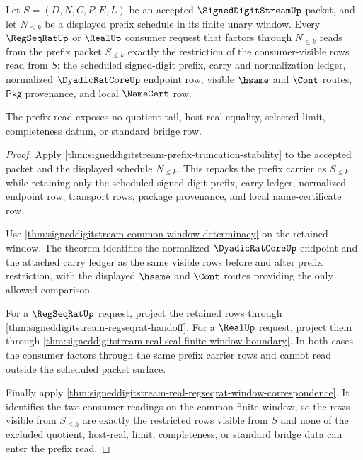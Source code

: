 \begin{theorem}
\label{thm:signeddigitstream-prefix-consumer-invariance}
Let $S=(D,N,C,P,E,L)$ be an accepted $\SignedDigitStreamUp$ packet, and let
$N_{\leq k}$ be a displayed prefix schedule in its finite unary window. Every
$\RegSeqRatUp$ or $\RealUp$ consumer request that factors through
$N_{\leq k}$ reads from the prefix packet $S_{\leq k}$ exactly the restriction
of the consumer-visible rows read from $S$: the scheduled signed-digit prefix,
carry and normalization ledger, normalized $\DyadicRatCoreUp$ endpoint row,
visible $\hsame$ and $\Cont$ routes, $\mathsf{Pkg}$ provenance, and local
$\NameCert$ row.

The prefix read exposes no quotient tail, host real equality, selected limit,
completeness datum, or standard bridge row.
\end{theorem}
\begin{proof}
Apply
\autoref{thm:signeddigitstream-prefix-truncation-stability} to the accepted
packet and the displayed schedule $N_{\leq k}$. This repacks the prefix carrier
as $S_{\leq k}$ while retaining only the scheduled signed-digit prefix, carry
ledger, normalized endpoint row, transport rows, package provenance, and local
name-certificate row.

Use
\autoref{thm:signeddigitstream-common-window-determinacy} on the retained
window. The theorem identifies the normalized $\DyadicRatCoreUp$ endpoint and
the attached carry ledger as the same visible rows before and after prefix
restriction, with the displayed $\hsame$ and $\Cont$ routes providing the only
allowed comparison.

For a $\RegSeqRatUp$ request, project the retained rows through
\autoref{thm:signeddigitstream-regseqrat-handoff}. For a $\RealUp$ request,
project them through
\autoref{thm:signeddigitstream-real-seal-finite-window-boundary}. In both
cases the consumer factors through the same prefix carrier rows and cannot read
outside the scheduled packet surface.

Finally apply
\autoref{thm:signeddigitstream-real-regseqrat-window-correspondence}. It
identifies the two consumer readings on the common finite window, so the rows
visible from $S_{\leq k}$ are exactly the restricted rows visible from $S$ and
none of the excluded quotient, host-real, limit, completeness, or standard
bridge data can enter the prefix read.
\end{proof}

